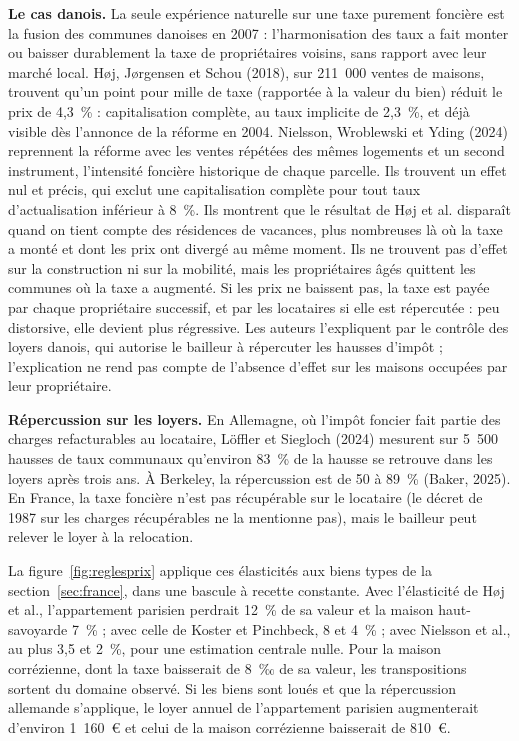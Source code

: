 \documentclass[11pt,a4paper]{article}
\begin{document}
\textbf{Le cas danois.} La seule expérience naturelle sur une taxe purement foncière est la fusion
des communes danoises en 2007 : l'harmonisation des taux a fait monter ou baisser durablement la
taxe de propriétaires voisins, sans rapport avec leur marché local. Høj, Jørgensen et Schou (2018), sur 211~000 ventes de maisons, trouvent qu'un point pour
mille de taxe (rapportée à la valeur du bien) réduit le prix de 4,3~\% : capitalisation complète,
au taux implicite de 2,3~\%, et déjà visible dès l'annonce de la réforme en 2004. Nielsson,
Wroblewski et Yding (2024) reprennent la réforme avec les ventes répétées des mêmes logements et
un second instrument, l'intensité foncière historique de chaque parcelle. Ils trouvent un effet
nul et précis, qui exclut une capitalisation complète pour tout taux d'actualisation inférieur à
8~\%. Ils montrent que le résultat de Høj et al. disparaît quand on tient compte des résidences de
vacances, plus nombreuses là où la taxe a monté et dont les prix ont divergé au même moment.
Ils ne trouvent pas d'effet sur la construction ni sur la mobilité, mais les propriétaires
âgés quittent les communes où la taxe a augmenté. Si les prix ne
baissent pas, la taxe est payée par chaque propriétaire successif, et par les locataires si elle
est répercutée : peu distorsive, elle devient plus régressive. Les auteurs l'expliquent par le contrôle des loyers
danois, qui autorise le bailleur à répercuter les hausses d'impôt ; l'explication ne rend pas
compte de l'absence d'effet sur les maisons occupées par leur propriétaire.

\textbf{Répercussion sur les loyers.} En Allemagne, où l'impôt foncier fait partie des charges
refacturables au locataire, Löffler et Siegloch (2024) mesurent sur 5~500 hausses de taux
communaux qu'environ 83~\% de la hausse se retrouve dans les loyers après trois ans. À Berkeley,
la répercussion est de 50 à 89~\% (Baker, 2025). En France, la taxe foncière n'est pas récupérable sur le locataire (le
décret de 1987 sur les charges récupérables ne la mentionne pas), mais le bailleur peut relever le
loyer à la relocation.

La figure~\ref{fig:reglesprix} applique ces élasticités aux biens types de la
section~\ref{sec:france}, dans une bascule à recette constante. Avec l'élasticité de Høj et al.,
l'appartement parisien perdrait 12~\% de sa valeur et la maison haut-savoyarde 7~\% ; avec celle de
Koster et Pinchbeck, 8 et 4~\% ; avec Nielsson et al., au plus 3,5 et 2~\%, pour une estimation
centrale nulle. Pour la maison corrézienne, dont la taxe baisserait de 8~‰ de sa valeur, les
transpositions sortent du domaine observé. Si les biens sont loués et que la répercussion
allemande s'applique, le loyer annuel de l'appartement parisien augmenterait d'environ 1~160~€ et
celui de la maison corrézienne baisserait de 810~€.
\end{document}
